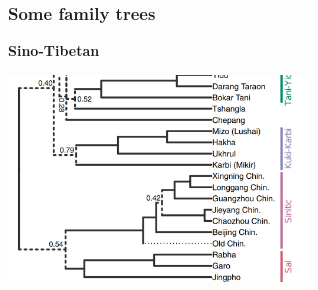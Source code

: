 \documentclass{beamer}
\begin{document}
\begin{frame}
\frametitle{Some family trees}

\textbf{Sino-Tibetan} 

\begin{center}
    \includegraphics[width=0.6\textwidth]{history-trees/sino-tibetan-1.PNG}
\end{center}

\end{frame}
\end{document}
